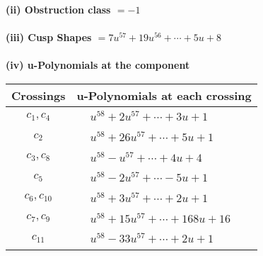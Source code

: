\documentclass[1p]{elsarticle_modified}
\theoremstyle{definition}
\begin{document}
\flushleft \textbf{(ii) Obstruction class $= -1$}\\~\\
\flushleft \textbf{(iii) Cusp Shapes $= 7 u^{57}+19 u^{56}+\cdots+5 u+8$}\\~\\
\newpage\renewcommand{\arraystretch}{1}
\flushleft \textbf{(iv) u-Polynomials at the component}\newline \\
\begin{tabular}{m{50pt}|m{274pt}}
Crossings & \hspace{64pt}u-Polynomials at each crossing \\
\hline $$\begin{aligned}c_{1},c_{4}\end{aligned}$$&$\begin{aligned}
&u^{58}+2 u^{57}+\cdots+3 u+1
\end{aligned}$\\
\hline $$\begin{aligned}c_{2}\end{aligned}$$&$\begin{aligned}
&u^{58}+26 u^{57}+\cdots+5 u+1
\end{aligned}$\\
\hline $$\begin{aligned}c_{3},c_{8}\end{aligned}$$&$\begin{aligned}
&u^{58}- u^{57}+\cdots+4 u+4
\end{aligned}$\\
\hline $$\begin{aligned}c_{5}\end{aligned}$$&$\begin{aligned}
&u^{58}-2 u^{57}+\cdots-5 u+1
\end{aligned}$\\
\hline $$\begin{aligned}c_{6},c_{10}\end{aligned}$$&$\begin{aligned}
&u^{58}+3 u^{57}+\cdots+2 u+1
\end{aligned}$\\
\hline $$\begin{aligned}c_{7},c_{9}\end{aligned}$$&$\begin{aligned}
&u^{58}+15 u^{57}+\cdots+168 u+16
\end{aligned}$\\
\hline $$\begin{aligned}c_{11}\end{aligned}$$&$\begin{aligned}
&u^{58}-33 u^{57}+\cdots+2 u+1
\end{aligned}$\\
\hline
\end{tabular}\\~\\
\end{document}

